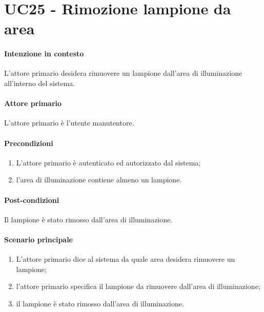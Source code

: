 \section{UC25 - Rimozione lampione da area}\label{uc:25}
\paragraph{Intenzione in contesto} L'attore primario desidera rimuovere un lampione dall'area di illuminazione all'interno del sistema.
\paragraph{Attore primario} L'attore primario è l'utente manutentore.
\paragraph{Precondizioni}  
\begin{enumerate}
    \item L'attore primario è autenticato ed autorizzato dal sistema;
    \item l'area di illuminazione contiene almeno un lampione.
\end{enumerate}
\paragraph{Post-condizioni} Il lampione è stato rimosso dall'area di illuminazione.
\paragraph{Scenario principale}
\begin{enumerate}
    \item L'attore primario dice al sistema da quale area desidera rimuovere un lampione;
    \item l'attore primario specifica il lampione da rimuovere dall'area di illuminazione;
    \item il lampione è stato rimosso dall'area di illuminazione.
\end{enumerate}